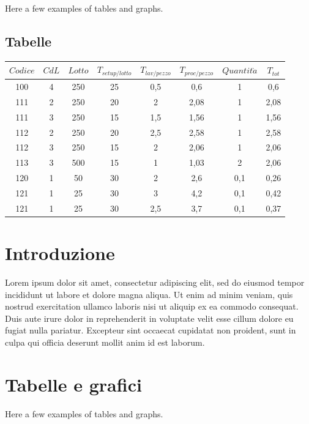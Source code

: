 \documentclass{FR16}
\begin{document}
Here a few examples of tables and graphs.
\subsection{Tabelle}
\begin{center}
\begin{tabular}{c c c c c c c c}
\arrayrulecolor{Azzurro}
\hline
{\bfseries $Codice$} & {\bfseries $CdL$} & {\bfseries $Lotto$} & {\bfseries $T_{setup/lotto}$} & {\bfseries $T_{lav/pezzo}$} & {\bfseries $T_{proc/pezzo}$} & {\bfseries$Quantit\grave{a}$} & {\bfseries $T_{tot}$}\\
\hline
100 & 4 & 250 & 25 & 0,5 & 0,6 & 1 & 0,6\\
111 & 2 & 250 & 20 & 2 & 2,08 & 1 & 2,08 \\
111 & 3 & 250 & 15 & 1,5 & 1,56 & 1 & 1,56 \\
112 & 2 & 250 & 20 & 2,5 & 2,58 & 1 & 2,58 \\
112 & 3 & 250 & 15 & 2 & 2,06 & 1 & 2,06\\
113 & 3 & 500 & 15 & 1 & 1,03 & 2 & 2,06\\
120 & 1 & 50 & 30 & 2 & 2,6 & 0,1 & 0,26\\
121 & 1 & 25 & 30 & 3 & 4,2 & 0,1 & 0,42 \\
121 & 1 & 25 & 30 & 2,5 & 3,7 & 0,1 & 0,37 \\
\hline
\end{tabular}
\end{center}





\section{Introduzione}
Lorem ipsum dolor sit amet, consectetur adipiscing elit, sed do eiusmod tempor incididunt ut labore et dolore magna aliqua. Ut enim ad minim veniam, quis nostrud exercitation ullamco laboris nisi ut aliquip ex ea commodo consequat. Duis aute irure dolor in reprehenderit in voluptate velit esse cillum dolore eu fugiat nulla pariatur. Excepteur sint occaecat cupidatat non proident, sunt in culpa qui officia deserunt mollit anim id est laborum.
\newpage

\section{Tabelle e grafici}
Here a few examples of tables and graphs.
\end{document}
